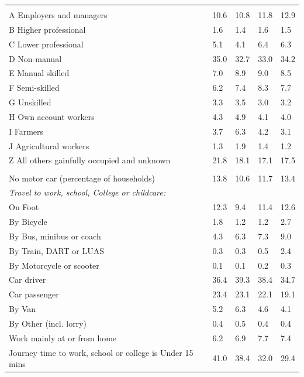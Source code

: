 \documentclass{article}
\begin{document}
\begin{table}[h]
\begin{tabular}{KTTTT}
\hline
    \\ 
    \hline
A Employers and managers & 10.6& 10.8& 11.8& 12.9\\
B Higher professional & 1.6& 1.4& 1.6& 1.5\\
C Lower professional & 5.1& 4.1& 6.4& 6.3\\
D Non-manual & 35.0& 32.7& 33.0& 34.2\\
E Manual skilled & 7.0& 8.9& 9.0& 8.5\\
F Semi-skilled & 6.2& 7.4& 8.3& 7.7\\
G Unskilled & 3.3& 3.5& 3.0& 3.2\\
H Own account workers & 4.3& 4.9& 4.1& 4.0\\
I Farmers & 3.7& 6.3& 4.2& 3.1\\
J Agricultural workers & 1.3& 1.9& 1.4& 1.2\\
Z All others gainfully occupied and unknown & 21.8& 18.1& 17.1& 17.5\\
\hline
{}\hline
    \\ 
    \hline
No motor car (percentage of households) & 13.8& 10.6& 11.7& 
13.4\\
    \hline 
\emph{Travel to work, school, College or childcare:} & & & \\
\quad On Foot & 12.3&  9.4& 11.4& 12.6\\ 
\quad By Bicycle & 1.8& 1.2& 1.2& 2.7\\ 
\quad By Bus, minibus or coach & 4.3& 6.3& 7.3& 9.0\\
\quad By Train, DART or LUAS & 0.3& 0.3& 0.5& 2.4\\
\quad By Motorcycle or scooter & 0.1& 0.1& 0.2& 0.3\\
\quad Car driver & 36.4 & 39.3& 38.4& 34.7\\
\quad Car passenger & 23.4& 23.1& 22.1& 19.1\\
\quad By Van & 5.2& 6.3& 4.6& 4.1\\
\quad By Other (incl. lorry) & 0.4& 0.5& 0.4& 0.4\\
    \hline
Work mainly at or from home & 6.2& 6.9& 7.7& 7.4\\
Journey time to work, school or college is Under 15 mins & 41.0& 38.4& 32.0& 29.4\\

\end{tabular}
\end{table}
\end{document}
